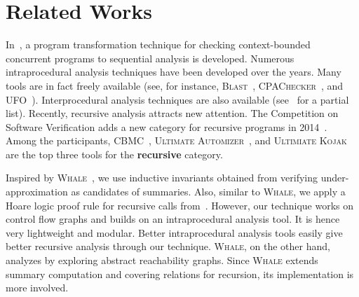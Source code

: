 
\chapter{Related Works}\label{ch:related}

In~\cite{LalR08,LalR09}, a program transformation technique for checking context-bounded concurrent programs to sequential analysis is developed. Numerous intraprocedural analysis techniques have been developed over the years. Many tools are in fact freely available (see, for instance, \textsc{Blast}~\cite{BeyerHJM07}, \textsc{CPAChecker}~\cite{BeyerK11}, and \textsc{UFO}~\cite{AlbarghouthiLGC12}). Interprocedural analysis techniques are also available (see~\cite{RepsHS95,BallR01,CousotCFMMMR05,CuoqKKPSY12,coverity,polyspace} for a partial list). Recently, recursive analysis attracts new attention. The Competition on Software Verification adds a new category for recursive programs in 2014~\cite{svcomp14}. Among the participants, \textsc{CBMC}~\cite{ClarkeKL04}, \textsc{Ultimate Automizer}~\cite{HeizmannCDEHLNSP13}, and \textsc{Ultimiate Kojak}~\cite{ErmisNDHP14} are the top three tools for the \textbf{recursive} category.

Inspired by \textsc{Whale}~\cite{AlbarghouthiGC12}, we use inductive invariants obtained from verifying under-approximation as candidates of summaries. Also, similar to \textsc{Whale}, we apply a Hoare logic proof rule for recursive calls from~\cite{Oheimb99}. However, our technique works on control flow graphs and builds on an intraprocedural analysis tool. It is hence very lightweight and modular. Better intraprocedural analysis tools easily give better recursive analysis through our technique. \textsc{Whale}, on the other hand, analyzes by exploring abstract reachability graphs. Since \textsc{Whale} extends summary computation and covering relations for recursion, its implementation is more involved.
